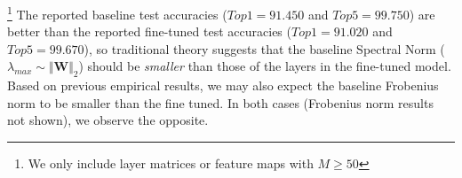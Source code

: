 \footnote{We only include layer matrices or feature maps with  $M\ge50$}
The reported baseline  test accuracies ($Top1=91.450$ and $Top5=99.750$)
are better than the reported fine-tuned test accuracies ($Top1=91.020$ and $Top5=99.670$), so traditional theory suggests that the baseline Spectral Norm
($\lambda_{max}\sim\Vert\mathbf{W}\Vert_{2}$) should be \emph{smaller} than those of the layers in the fine-tuned model.
Based on previous empirical results, we may also expect the baseline Frobenius norm to be smaller than the fine tuned. 
In both cases (Frobenius norm results not shown), we observe the opposite.

